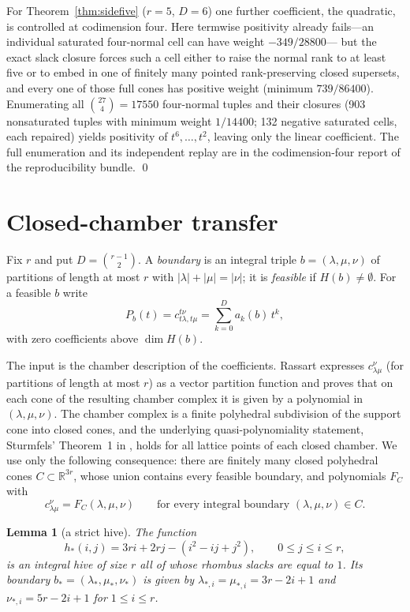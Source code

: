 \documentclass[11pt]{amsart}
\newtheorem{lemma}[theorem]{Lemma}
\theoremstyle{definition}
\newcommand{\R}{\mathbb{R}}
\newcommand{\lam}{\lambda}
\begin{document}
For Theorem~\ref{thm:sidefive} ($r=5$, $D=6$) one further coefficient, the
quadratic, is controlled at codimension four. Here termwise positivity already
fails---an individual saturated four-normal cell can have weight $-349/28800$---%
but the exact slack closure forces such a cell either to raise the normal rank to
at least five or to embed in one of finitely many pointed rank-preserving closed
supersets, and every one of those full cones has positive weight (minimum
$739/86400$). Enumerating all $\binom{27}{4}=17550$ four-normal tuples and their
closures (903 nonsaturated tuples with minimum weight $1/14400$; 132 negative
saturated cells, each repaired) yields positivity of $t^{6},\dots,t^{2}$, leaving
only the linear coefficient. The full enumeration and its independent replay are
in the codimension-four report of the reproducibility bundle. \qed

\section{Closed-chamber transfer}\label{sec:transfer}

Fix $r$ and put $D=\binom{r-1}{2}$. A \emph{boundary} is an integral triple
$b=(\lam,\mu,\nu)$ of partitions of length at most $r$ with $|\lam|+|\mu|=|\nu|$;
it is \emph{feasible} if $H(b)\ne\emptyset$. For a feasible $b$ write
\[
  P_b(t)=c^{t\nu}_{t\lam,t\mu}=\sum_{k=0}^{D}a_k(b)\,t^{k},
\]
with zero coefficients above $\dim H(b)$.

The input is the chamber description of the coefficients. Rassart
\cite[Theorem~2.3, Corollary~2.5 and Theorem~4.1]{Rassart} expresses
$c^{\nu}_{\lam\mu}$ (for partitions of length at most $r$) as a vector
partition function and proves that on each cone of the resulting chamber
complex it is given by a polynomial in $(\lam,\mu,\nu)$. The chamber complex is
a finite polyhedral subdivision of the support cone into closed cones, and the
underlying quasi-polynomiality statement, Sturmfels' Theorem~1 in
\cite{Sturmfels}, holds for all lattice points of each closed chamber. We use
only the following consequence: there are finitely many closed polyhedral cones
$C\subset\R^{3r}$, whose union contains every feasible boundary, and polynomials
$F_C$ with
\begin{equation}\label{eq:chamber}
  c^{\nu}_{\lam\mu}=F_C(\lam,\mu,\nu)\qquad\text{for every integral boundary }
  (\lam,\mu,\nu)\in C.
\end{equation}

\begin{lemma}[a strict hive]\label{lem:stricthive}
The function
\[
  h_*(i,j)=3ri+2rj-(i^2-ij+j^2),\qquad 0\le j\le i\le r,
\]
is an integral hive of size $r$ all of whose rhombus slacks are equal to $1$.
Its boundary $b_*=(\lam_*,\mu_*,\nu_*)$ is given by
$\lam_{*,i}=\mu_{*,i}=3r-2i+1$ and $\nu_{*,i}=5r-2i+1$ for $1\le i\le r$.
\end{lemma}
\end{document}
